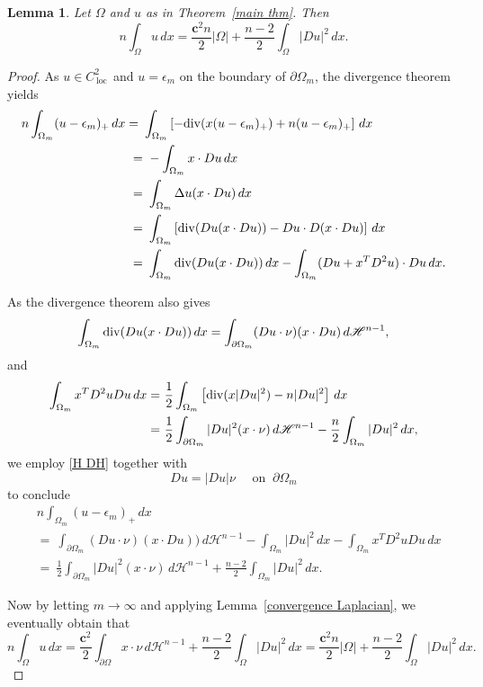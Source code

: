 \documentclass[reqno,11pt]{amsart}
\makeatletter
\def\loc{{\mathop\mathrm{\,loc\,}}}
\def\ez{\epsilon}
\newtheorem{lem}[thm]{Lemma}%
\numberwithin{equation}{section}
\theoremstyle{remark}
\makeatother
\begin{document}
\begin{lem}\label{Pohozaev 1}
    Let $\Omega$ and $u$ as in Theorem~\ref{main thm}. Then 
    $$n\int_{\Omega}u\,dx = \frac{\mathbf{c}^2 n}2 |\Omega| + \frac{n-2} 2\int_{\Omega} |Du|^2\, dx. $$
\end{lem}
\begin{proof}
As $u\in C^2_\loc$ and $u=\ez_m$ on the boundary of $\partial\Omega_m$, the divergence theorem yields
\begin{align*}
n\int_{\Omega_m} (u-\ez_m)_+\, dx=\ & \int_{\Omega_m} \left[-{\rm div}(x (u-\ez_m)_+) + n (u-\ez_m)_+\right]\, dx\\
=&\ -\int_{\Omega_m} x\cdot Du\, dx\\
=&\ \int_{\Omega_m} \Delta u  (x\cdot Du)\,dx\\
= & \  \int_{\Omega_m} \left[{\rm div}(Du (x\cdot Du))  -   Du\cdot D(x\cdot Du)\right]\, dx\\
= & \  \int_{\Omega_m} {\rm div}(Du (x\cdot Du))\,dx - \int_{\Omega_m}  (Du+x^T D^2u )\cdot Du\, dx.
\end{align*}

As the divergence theorem also gives 
$$\int_{\Omega_m} {\rm div}(Du (x\cdot Du))\,dx = \int_{\partial \Omega_m} (Du\cdot \nu) (x\cdot Du)\,d\mathscr H^{n-1},$$
and
\begin{align*}
    \int_{\Omega_m}x^T D^2u Du\, dx=& \ \frac 1 2\int_{\Omega_m} \left[ {\rm div}(x |Du|^2)-n|Du|^2\right]\, dx \\
    = &\ \frac 1 2\int_{\partial\Omega_m} |Du|^2 (x\cdot \nu)\, d\mathscr H^{n-1} -\frac  n 2 \int_{\Omega_m}|Du|^2\, dx,
\end{align*} 
we employ \eqref{H DH} together with 
$$Du=|Du| \nu \quad \text{ on } \ \partial \Omega_m $$
to conclude
\begin{align*}
    &n\int_{\Omega_m} (u-\ez_m)_+\, dx \\
    &= \ \int_{\partial \Omega_m} (Du\cdot \nu) (x\cdot Du))\,d\mathscr H^{n-1} -  \int_{\Omega_m} |Du|^2\, dx -\int_{\Omega_m} x^T D^2u   Du  \, dx\\
    &= \ \frac 1 2\int_{\partial \Omega_m}  |Du|^2 (x\cdot \nu)\,d\mathscr H^{n-1} +\frac{n-2} 2 \int_{\Omega_m} |Du|^2\, dx.
\end{align*}

Now by letting $m\to \infty$ and applying Lemma~\ref{convergence Laplacian}, we eventually obtain that
$$n\int_{\Omega}u \, dx = \frac{\mathbf{c}^2}{2} \int_{\partial \Omega}   x\cdot \nu\,d\mathscr H^{n-1} +\frac{n-2} 2 \int_{\Omega} |Du|^2\, dx=  \frac{\mathbf{c}^2 n}{2}|\Omega| + \frac{n-2} 2\int_{\Omega} |Du|^2\, dx.$$
\end{proof}
\end{document}
